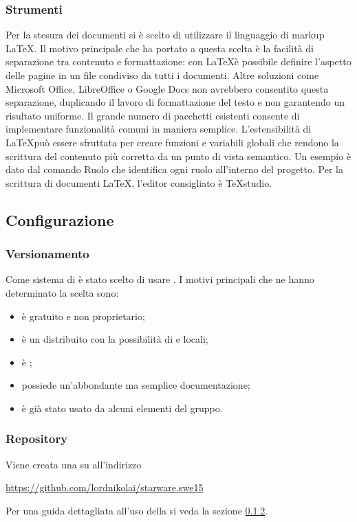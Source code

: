 \documentclass[12pt,a4paper]{article}
\begin{document}
\subsubsection{Strumenti}
Per la stesura dei documenti si è scelto di utilizzare il linguaggio di markup \LaTeX. Il motivo principale che ha portato a questa scelta è la facilità di separazione tra contenuto e formattazione: con \LaTeX è possibile definire l’aspetto delle pagine in un file  condiviso da tutti i documenti. Altre soluzioni come Microsoft Office, LibreOffice o Google Docs non avrebbero consentito questa separazione, duplicando il lavoro di formattazione del testo e non garantendo un risultato uniforme. Il grande numero di pacchetti esistenti consente di implementare funzionalità comuni in maniera semplice. L’estensibilità di \LaTeX può essere sfruttata per creare funzioni e variabili globali che rendono la scrittura del contenuto più corretta da un punto di vista semantico. Un esempio è dato dal comando Ruolo che identifica ogni ruolo all’interno del progetto. Per la scrittura di documenti \LaTeX, l’editor consigliato è TeXstudio.

\subsection{Configurazione} %

\subsubsection{Versionamento}\label{versionamento} %
Come sistema di  è stato scelto di usare . I motivi principali che ne hanno determinato la scelta sono:
\begin{itemize}
	\item è gratuito e non proprietario;
	\item è un  distribuito con la possibilità di  e  locali;
	\item è ;
	\item possiede un'abbondante ma semplice documentazione;
	\item è già stato usato da alcuni elementi del gruppo.
\end{itemize}

\subsubsection{Repository} \label{sec:rep} %
Viene creata una  su  all'indirizzo 
\begin{center}
	\url{https://github.com/lordnikolai/starware.swe15}
\end{center}
Per una guida dettagliata all'uso della  si veda la sezione \ref{sec:rep}.
\end{document}
